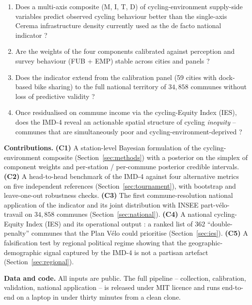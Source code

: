 \documentclass[11pt,a4paper]{article}
\begin{document}
\begin{enumerate}[leftmargin=*]
    \item[\textbf{Q1}] Does a multi-axis composite (M, I, T, D) of
          cycling-environment supply-side variables predict observed
          cycling behaviour better than the single-axis Cerema
          infrastructure density currently used as the de facto
          national indicator ?

    \item[\textbf{Q2}] Are the weights of the four components
          calibrated against perception and survey behaviour
          (FUB + EMP) stable across cities and panels ?

    \item[\textbf{Q3}] Does the indicator extend from the calibration
          panel (59 cities with dock-based bike sharing) to the full
          national territory of $34{,}858$ communes without loss of
          predictive validity ?

    \item[\textbf{Q4}] Once residualised on commune income via the
          cycling-Equity Index (IES), does the IMD-4 reveal an
          actionable spatial structure of cycling
          \emph{inequity} -- communes that are simultaneously poor
          and cycling-environment-deprived ?
\end{enumerate}

\noindent\textbf{Contributions.}
\textbf{(C1)} A station-level Bayesian formulation of the cycling-
environment composite (Section~\ref{sec:methods}) with a posterior
on the simplex of component weights and per-station / per-commune
posterior credible intervals.
\textbf{(C2)} A head-to-head benchmark of the IMD-4 against four
alternative metrics on five independent references
(Section~\ref{sec:tournament}), with bootstrap and leave-one-out
robustness checks.
\textbf{(C3)} The first commune-resolution national application of
the indicator and its joint distribution with INSEE part-v\'elo-travail
on $34{,}858$ communes (Section~\ref{sec:national}).
\textbf{(C4)} A national cycling-Equity Index (IES) and its operational
output : a ranked list of $362$ ``double-penalty'' communes that the
Plan V\'elo could prioritise (Section~\ref{sec:ies}).
\textbf{(C5)} A falsification test by regional political regime
showing that the geographic-demographic signal captured by the
IMD-4 is not a partisan artefact (Section~\ref{sec:regional}).

\noindent\textbf{Data and code.}  All inputs are public.  The full
pipeline -- collection, calibration, validation, national application
-- is released under MIT licence and runs end-to-end on a laptop in
under thirty minutes from a clean clone.
\end{document}
